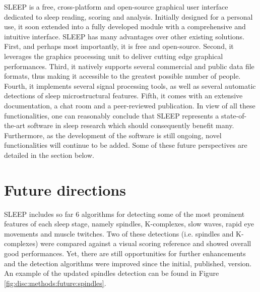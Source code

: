SLEEP is a free, cross-platform and open-source graphical user interface dedicated to sleep reading, scoring and analysis. Initially designed for a personal use, it soon extended into a fully developed module with a comprehensive and intuitive interface. SLEEP has many advantages over other existing solutions. First, and perhaps most importantly, it is free and open-source. Second, it leverages the graphics processing unit to deliver cutting edge graphical performances. Third, it natively supports several commercial and public data file formats, thus making it accessible to the greatest possible number of people. Fourth, it implements several signal processing tools, as well as several automatic detections of sleep microstructural features. Fifth, it comes with an extensive documentation, a chat room and a peer-reviewed publication. In view of all these functionalities, one can reasonably conclude that SLEEP represents a state-of-the-art software in sleep research which should consequently benefit many. Furthermore, as the development of the software is still ongoing, novel functionalities will continue to be added. Some of these future perspectives are detailed in the section below.

\section{Future directions}
\label{disc:methods:future}

SLEEP includes so far 6 algorithms for detecting some of the most prominent features of each sleep stage, namely spindles, K-complexes, slow waves, rapid eye movements and muscle twitches. Two of these detections (i.e. spindles and K-complexes) were compared against a visual scoring reference and showed overall good performances. Yet, there are still opportunities for further enhancements and the detection algorithms were improved since the initial, published, version. An example of the updated spindles detection can be found in Figure \ref{fig:disc:methods:future:spindles}.

